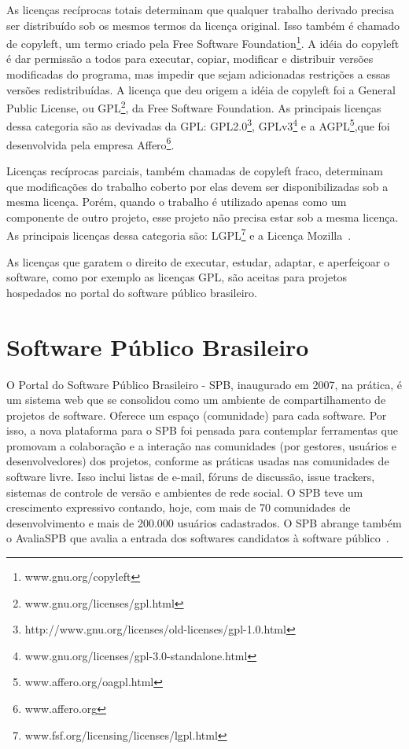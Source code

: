 As licenças recíprocas totais determinam que qualquer trabalho derivado precisa 
ser distribuído sob os mesmos termos da licença original. Isso também é chamado de copyleft,
um termo criado pela Free Software Foundation\footnote{www.gnu.org/copyleft}. A idéia do
copyleft é dar permissão a todos para executar, copiar, modificar e distribuir versões
modificadas do programa, mas impedir que sejam adicionadas restrições a essas versões
redistribuídas. A licença que deu origem a idéia de copyleft foi a General Public 
License, ou GPL\footnote{www.gnu.org/licenses/gpl.html}, da Free Software Foundation.
As principais licenças dessa categoria são as devivadas da GPL: 
GPL2.0\footnote{http://www.gnu.org/licenses/old-licenses/gpl-1.0.html}, 
GPLv3\footnote{www.gnu.org/licenses/gpl-3.0-standalone.html} e a
AGPL\footnote{www.affero.org/oagpl.html},que foi desenvolvida pela empresa 
Affero\footnote{www.affero.org}.~\cite{sabino2009licenccas}

Licenças recíprocas parciais, também chamadas de copyleft fraco, determinam que
modificações do trabalho coberto por elas devem ser disponibilizadas sob a mesma 
licença. Porém, quando o trabalho é utilizado apenas como um componente de outro 
projeto, esse projeto não precisa estar sob a mesma licença. As principais licenças
dessa categoria são: LGPL\footnote{www.fsf.org/licensing/licenses/lgpl.html} e a
Licença Mozilla~\cite{sabino2009licenccas}.

As licenças que garatem o direito de executar, estudar, adaptar, e aperfeiçoar o software,
como por exemplo as licenças GPL, são aceitas para projetos hospedados no portal do software
público brasileiro.

\section{Software Público Brasileiro}

O Portal do Software Público Brasileiro - SPB, inaugurado em 2007, na prática, é um sistema
web que se consolidou como um ambiente de compartilhamento de projetos de software. Oferece um
espaço (comunidade) para cada software. Por isso, a nova plataforma para o SPB foi pensada
para contemplar ferramentas que promovam a colaboração e a interação nas comunidades 
(por gestores, usuários e desenvolvedores) dos projetos, conforme as práticas usadas nas
comunidades de software livre. Isso inclui listas de e-mail, fóruns de discussão, 
issue trackers, sistemas de controle de versão e ambientes de rede social.
O SPB teve um crescimento expressivo contando, hoje, com mais de 70 comunidades
de desenvolvimento e mais de 200.000 usuários cadastrados. O SPB abrange também o 
AvaliaSPB que avalia a entrada dos softwares candidatos à software público~\cite{softwarepublico}.

